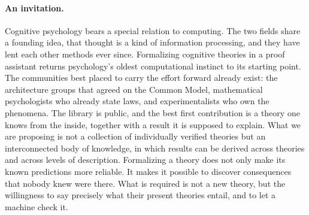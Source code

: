 \documentclass[11pt]{article}
\begin{document}
\paragraph{An invitation.}
Cognitive psychology bears a special relation to computing. The two
fields share a founding idea, that thought is a kind of information
processing, and they have lent each other methods ever since.
Formalizing cognitive theories in a proof assistant returns
psychology's oldest computational instinct to its starting point. The
communities best placed to carry the effort forward already exist: the
architecture groups that agreed on the Common Model, mathematical
psychologists who already state laws, and experimentalists who own the
phenomena. The library is public, and the best first contribution is a
theory one knows from the inside, together with a result it is supposed
to explain. What we are proposing is not a collection of individually
verified theories but an interconnected body of knowledge, in which
results can be derived across theories and across levels of
description. Formalizing a theory does not only make its known
predictions more reliable. It makes it possible to discover
consequences that nobody knew were there. What is required is not a new theory, but the
willingness to say precisely what their present theories entail, and
to let a machine check it.
\end{document}
